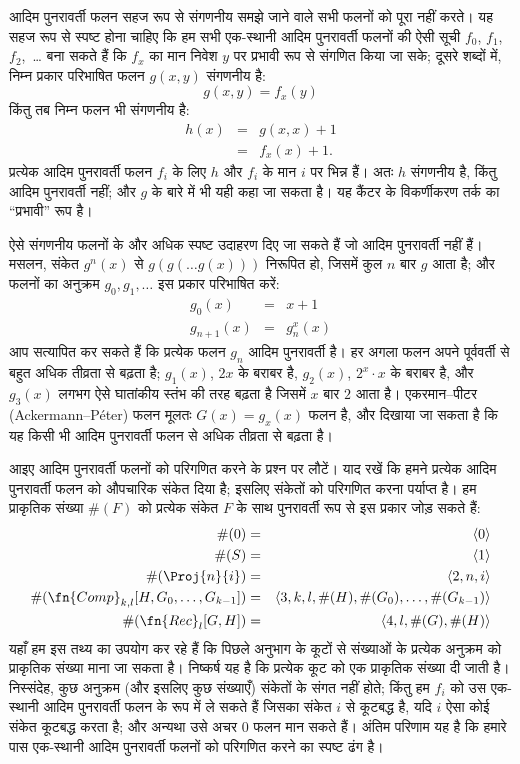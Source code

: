 \documentclass[../../../include/open-logic-section]{subfiles}
\begin{document}

आदिम पुनरावर्ती फलन सहज रूप से संगणनीय समझे जाने वाले सभी फलनों को पूरा
नहीं करते। यह सहज रूप से स्पष्ट होना चाहिए कि हम सभी एक-स्थानी आदिम
पुनरावर्ती फलनों की ऐसी सूची $f_0$, $f_1$, $f_2$,~\dots{} बना सकते हैं
कि $f_x$ का मान निवेश $y$ पर प्रभावी रूप से संगणित किया जा सके; दूसरे
शब्दों में, निम्न प्रकार परिभाषित फलन $g(x,y)$ संगणनीय है:
\[
g(x,y) = f_x(y)
\]
किंतु तब निम्न फलन भी संगणनीय है:
\begin{eqnarray*}
h(x) & = & g(x,x) + 1 \\
& = & f_x(x) +1.
\end{eqnarray*}
प्रत्येक आदिम पुनरावर्ती फलन $f_i$ के लिए $h$ और $f_i$ के मान $i$ पर
भिन्न हैं। अतः $h$ संगणनीय है, किंतु आदिम पुनरावर्ती नहीं; और $g$ के
बारे में भी यही कहा जा सकता है। यह कैंटर के विकर्णीकरण तर्क का
``प्रभावी'' रूप है।

ऐसे संगणनीय फलनों के और अधिक स्पष्ट उदाहरण दिए जा सकते हैं जो आदिम
पुनरावर्ती नहीं हैं। मसलन, संकेत $g^n(x)$ से
$g(g(\dots g(x)))$ निरूपित हो, जिसमें कुल $n$ बार $g$ आता है; और फलनों
का अनुक्रम $g_0,g_1,\dots$ इस प्रकार परिभाषित करें:
\begin{eqnarray*}
g_0(x) & = & x+1 \\
g_{n + 1}(x) & = & g_n^x(x)
\end{eqnarray*}
आप सत्यापित कर सकते हैं कि प्रत्येक फलन $g_n$ आदिम पुनरावर्ती है। हर
अगला फलन अपने पूर्ववर्ती से बहुत अधिक तीव्रता से बढ़ता है; $g_1(x)$,
$2x$ के बराबर है, $g_2(x)$, $2^x \cdot x$ के बराबर है, और $g_3(x)$
लगभग ऐसे घातांकीय स्तंभ की तरह बढ़ता है जिसमें $x$ बार $2$ आता है।
एकरमान--पीटर (Ackermann--P\'eter) फलन मूलतः $G(x) = g_x(x)$ फलन है, और
दिखाया जा सकता है कि यह किसी भी आदिम पुनरावर्ती फलन से अधिक तीव्रता से
बढ़ता है।

आइए आदिम पुनरावर्ती फलनों को परिगणित करने के प्रश्न पर लौटें। याद रखें कि
हमने प्रत्येक आदिम पुनरावर्ती फलन को औपचारिक संकेत दिया है; इसलिए संकेतों
को परिगणित करना पर्याप्त है। हम प्राकृतिक संख्या $\#(F)$ को प्रत्येक
संकेत $F$ के साथ पुनरावर्ती रूप से इस प्रकार जोड़ सकते हैं:
\begin{eqnarray*}
\#(0) & = & \langle 0 \rangle \\
\#(S) & = & \langle 1 \rangle \\
\#(\Proj{n}{i}) & = & \langle 2, n, i \rangle \\
\#(\fn{Comp}_{k,l}[H,G_0,\dots,G_{k-1}]) & = & \langle
3,k,l,\#(H),\#(G_0),\dots,\#(G_{k-1}) \rangle \\
\#(\fn{Rec}_l[G,H]) & = & \langle 4, l, \#(G), \#(H) \rangle
\end{eqnarray*}
यहाँ हम इस तथ्य का उपयोग कर रहे हैं कि पिछले अनुभाग के कूटों से संख्याओं
के प्रत्येक अनुक्रम को प्राकृतिक संख्या माना जा सकता है। निष्कर्ष यह है
कि प्रत्येक कूट को एक प्राकृतिक संख्या दी जाती है। निस्संदेह, कुछ
अनुक्रम (और इसलिए कुछ संख्याएँ) संकेतों के संगत नहीं होते; किंतु हम $f_i$
को उस एक-स्थानी आदिम पुनरावर्ती फलन के रूप में ले सकते हैं जिसका संकेत
$i$ से कूटबद्ध है, यदि $i$ ऐसा कोई संकेत कूटबद्ध करता है; और अन्यथा उसे
अचर $0$ फलन मान सकते हैं। अंतिम परिणाम यह
है कि हमारे पास एक-स्थानी आदिम पुनरावर्ती फलनों को परिगणित करने का स्पष्ट
ढंग है।
\end{document}
